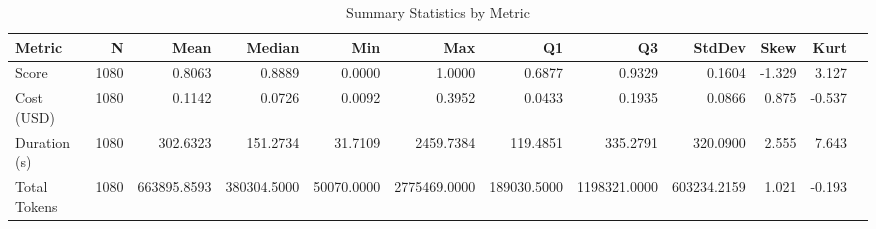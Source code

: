 \begin{table}[htbp]
\centering
\caption{Summary Statistics by Metric}
\label{tab:summary_statistics}
\small
\begin{tabular}{lrrrrrrrrrrr}
\toprule
Metric & N & Mean & Median & Min & Max & Q1 & Q3 & StdDev & Skew & Kurt \\
\midrule
Score & 1080 & 0.8063 & 0.8889 & 0.0000 & 1.0000 & 0.6877 & 0.9329 & 0.1604 & -1.329 & 3.127 \\
Cost (USD) & 1080 & 0.1142 & 0.0726 & 0.0092 & 0.3952 & 0.0433 & 0.1935 & 0.0866 & 0.875 & -0.537 \\
Duration (s) & 1080 & 302.6323 & 151.2734 & 31.7109 & 2459.7384 & 119.4851 & 335.2791 & 320.0900 & 2.555 & 7.643 \\
Total Tokens & 1080 & 663895.8593 & 380304.5000 & 50070.0000 & 2775469.0000 & 189030.5000 & 1198321.0000 & 603234.2159 & 1.021 & -0.193 \\
\bottomrule
\end{tabular}
\end{table}
